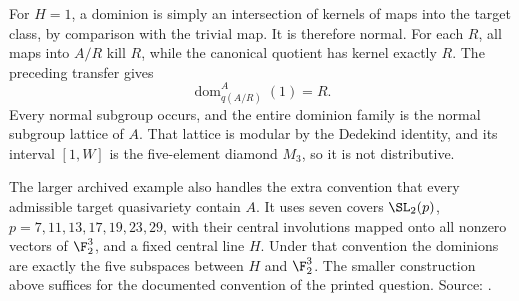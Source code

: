 For \(H=1\), a dominion is simply an intersection of kernels
of maps into the target class, by comparison with the trivial
map. It is therefore normal. For each \(R\), all maps into
\(A/R\) kill \(R\), while the canonical quotient has kernel
exactly \(R\). The preceding transfer gives
\[
 \operatorname{dom}^{A}_{q(A/R)}(1)=R.
\]
Every normal subgroup occurs, and the entire dominion family
is the normal subgroup lattice of \(A\). That lattice is
modular by the Dedekind identity, and its interval
\([1,W]\) is the five-element diamond \(M_3\), so it is
not distributive.

The larger archived example also handles the extra convention
that every admissible target quasivariety contain \(A\).
It uses seven covers \(\SL_2(p)\),
\(p=7,11,13,17,19,23,29\), with their central involutions
mapped onto all nonzero vectors of \(\F_2^3\), and a fixed
central line \(H\). Under that convention the dominions are
exactly the five subspaces between \(H\) and \(\F_2^3\).
The smaller construction above suffices for the documented
convention of the printed question. Source:
.

